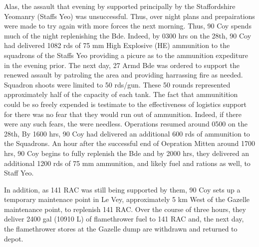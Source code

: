 \documentclass[noraggedright]{turabian-researchpaper}
\begin{document}
Alas, the assault that evening by %
supported principally by the Staffordshire Yeomanry (Staffs Yeo) %
was unsuccessful.  Thus, over night plans and prepairations were made to try 
again with more forces the next morning.  Thus, 90 Coy spends much of the 
night replenishing the Bde.  Indeed, by 0300 hrs on the 28th, 90 Coy had 
delivered 1082 rds of 75 mm High Explosive (HE) ammunition to the squadrons
of the Staffs Yeo providing a picure as to the ammunition expediture in the 
evening prior.  The next day, 27 Armd Bde was ordered to support the renewed
assault by patroling the area and providing harrassing fire as needed.  
Squadron shoots were limited to 50 rds/gun.\autocite[Operation Instruction 
No 2 (see June appendix)]{27wd}  These 50 rounds represented 
approximately half of the capacity of each tank.  
The fact that ammunitition could be so freely expended is testimate to the 
effectiveness of logistics support for there was no fear that they would
run out of ammunition.  Indeed, if there were any such fears, the were 
needless.  Operations resumed around 0500 on the 28th, By 1600 hrs, 90 Coy 
had delivered an additional 600 rds of ammunition to the Squadrons. An hour 
after the successful end of Oepration Mitten around 1700 hrs, 90 Coy begins
to fully replenish the Bde and by 2000 hrs, they delivered an additional 
1200 rds of 75 mm ammunition, and likely fuel and rations as well, to Staff 
Yeo.\autocite[28 June 1944]{90wd}

In addition, as 141 RAC was still being supported by them, 90 Coy sets up a 
temporary maintenace point in Le Vey, approximately 5 km West of the Gazelle 
maintenance point, to replenish 141 RAC.  Over the course of three hours, they
deliver 2400 gal (10910 L) of flamethrower fuel to 141 RAC and, the next
day, the flamethrower stores at the Gazelle dump are withdrawn and returned to 
depot.\autocite[28 -- 29 June 1944]{90wd} %
\end{document}
